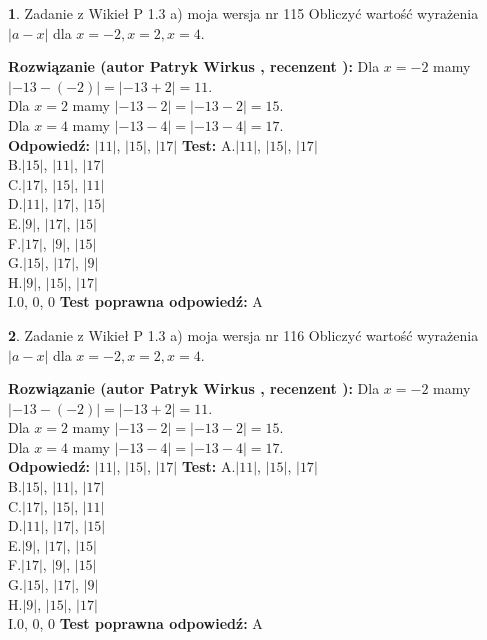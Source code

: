 \documentclass[12pt, a4paper]{article}
\theoremstyle{definition} %
\newtheorem{zad}{}
\newcommand{\zadStart}[1]{\begin{zad}#1\newline}
\newcommand{\zadStop}{\end{zad}}
\newcommand{\rozwStart}[2]{\noindent \textbf{Rozwiązanie (autor #1 , recenzent #2): }\newline}
\newcommand{\rozwStop}{\newline}
\newcommand{\odpStart}{\noindent \textbf{Odpowiedź:}\newline}
\newcommand{\odpStop}{\newline}
\newcommand{\testStart}{\noindent \textbf{Test:}\newline}
\newcommand{\testStop}{\newline}
\newcommand{\kluczStart}{\noindent \textbf{Test poprawna odpowiedź:}\newline}
\newcommand{\kluczStop}{\newline}
\begin{document}
\zadStart{Zadanie z Wikieł P 1.3 a) moja wersja nr 115}
Obliczyć wartość wyrażenia $|a - x|$ dla $x=-2,x=2,x=4$.
\zadStop
\rozwStart{Patryk Wirkus}{}
Dla $x = -2$ mamy $|-13 - (-2)| = |-13 + 2| = 11$.\\
Dla $x = 2$ mamy $|-13 - 2| = |-13 - 2| = 15$.\\
Dla $x = 4$ mamy $|-13 - 4| = |-13 - 4| = 17$.\\
\rozwStop
\odpStart
$|11|$, $|15|$, $|17|$
\odpStop
\testStart
A.$|11|$, $|15|$, $|17|$\\
B.$|15|$, $|11|$, $|17|$\\
C.$|17|$, $|15|$, $|11|$\\
D.$|11|$, $|17|$, $|15|$\\
E.$|9|$, $|17|$, $|15|$\\
F.$|17|$, $|9|$, $|15|$\\
G.$|15|$, $|17|$, $|9|$\\
H.$|9|$, $|15|$, $|17|$\\
I.$0$, $0$, $0$
\testStop
\kluczStart
A
\kluczStop



\zadStart{Zadanie z Wikieł P 1.3 a) moja wersja nr 116}
Obliczyć wartość wyrażenia $|a - x|$ dla $x=-2,x=2,x=4$.
\zadStop
\rozwStart{Patryk Wirkus}{}
Dla $x = -2$ mamy $|-13 - (-2)| = |-13 + 2| = 11$.\\
Dla $x = 2$ mamy $|-13 - 2| = |-13 - 2| = 15$.\\
Dla $x = 4$ mamy $|-13 - 4| = |-13 - 4| = 17$.\\
\rozwStop
\odpStart
$|11|$, $|15|$, $|17|$
\odpStop
\testStart
A.$|11|$, $|15|$, $|17|$\\
B.$|15|$, $|11|$, $|17|$\\
C.$|17|$, $|15|$, $|11|$\\
D.$|11|$, $|17|$, $|15|$\\
E.$|9|$, $|17|$, $|15|$\\
F.$|17|$, $|9|$, $|15|$\\
G.$|15|$, $|17|$, $|9|$\\
H.$|9|$, $|15|$, $|17|$\\
I.$0$, $0$, $0$
\testStop
\kluczStart
A
\kluczStop
\end{document}
